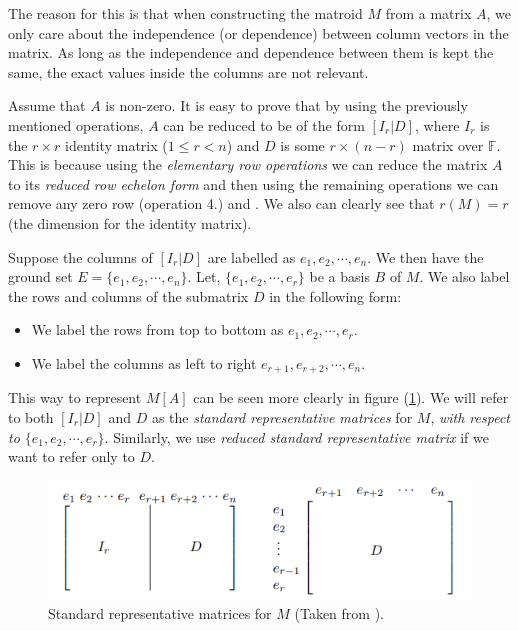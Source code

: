 The reason for this is that when constructing the matroid $M$ from a matrix $A$, we only care about the independence (or dependence) between column vectors in the matrix. As long as the independence and dependence between them is kept the same, the exact values inside the columns are not relevant.

Assume that $A$ is non-zero. It is easy to prove that by using the previously mentioned operations, $A$ can be reduced to be of the form $[I_r|D]$, where $I_r$ is the $r \times r$ identity matrix ($1\leq r< n$) and $D$ is some $r \times (n-r)$ matrix over $\mathbb{F}$. This is because using the \textit{elementary row operations} we can reduce the matrix $A$ to its \textit{reduced row echelon form} and then using the remaining operations we can remove any zero row (operation 4.) and . We also can clearly see that $r(M)=r$ (the dimension for the identity matrix). 

Suppose the columns of $[I_r|D]$ are labelled as $e_1, e_2,\cdots,e_n$. We then have the ground set $E=\{e_1, e_2,\cdots,e_n\}$. Let, $\{e_1, e_2,\cdots,e_r\}$ be a basis $B$ of $M$. We also label the rows and columns of the submatrix $D$ in the following form:
\begin{itemize}
  \item We label the rows from top to bottom as $e_1, e_2,\cdots,e_r$.
  \item We label the columns as left to right $e_{r+1}, e_{r+2},\cdots,e_n$.
\end{itemize}

  This way to represent $M[A]$ can be seen more clearly in figure (\ref{StandertRepMat}). We will refer to both $[I_r|D]$ and $D$ as the \textit{standard representative matrices} for $M$, \textit{with respect to $\{e_1, e_2,\cdots,e_r\}$}. Similarly, we use \textit{reduced standard representative matrix} if we want to refer only to $D$.

\begin{figure}[H]
    \centering
    \includegraphics{SRF.png}
    \caption{Standard representative matrices for $M$ (Taken from \cite[p. 78]{oxley1}).}
    \label{StandertRepMat}
\end{figure}

